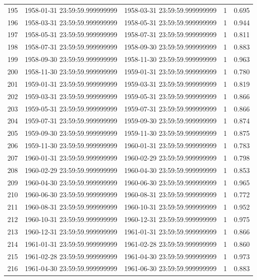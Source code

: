 \begin{table}
\begin{tabular}{lcccc}
195 & 1958-01-31 23:59:59.999999999 & 1958-03-31 23:59:59.999999999 & 1 & 0.695 \\
196 & 1958-03-31 23:59:59.999999999 & 1958-05-31 23:59:59.999999999 & 1 & 0.944 \\
197 & 1958-05-31 23:59:59.999999999 & 1958-07-31 23:59:59.999999999 & 1 & 0.811 \\
198 & 1958-07-31 23:59:59.999999999 & 1958-09-30 23:59:59.999999999 & 1 & 0.883 \\
199 & 1958-09-30 23:59:59.999999999 & 1958-11-30 23:59:59.999999999 & 1 & 0.963 \\
200 & 1958-11-30 23:59:59.999999999 & 1959-01-31 23:59:59.999999999 & 1 & 0.780 \\
201 & 1959-01-31 23:59:59.999999999 & 1959-03-31 23:59:59.999999999 & 1 & 0.819 \\
202 & 1959-03-31 23:59:59.999999999 & 1959-05-31 23:59:59.999999999 & 1 & 0.866 \\
203 & 1959-05-31 23:59:59.999999999 & 1959-07-31 23:59:59.999999999 & 1 & 0.866 \\
204 & 1959-07-31 23:59:59.999999999 & 1959-09-30 23:59:59.999999999 & 1 & 0.874 \\
205 & 1959-09-30 23:59:59.999999999 & 1959-11-30 23:59:59.999999999 & 1 & 0.875 \\
206 & 1959-11-30 23:59:59.999999999 & 1960-01-31 23:59:59.999999999 & 1 & 0.783 \\
207 & 1960-01-31 23:59:59.999999999 & 1960-02-29 23:59:59.999999999 & 1 & 0.798 \\
208 & 1960-02-29 23:59:59.999999999 & 1960-04-30 23:59:59.999999999 & 1 & 0.853 \\
209 & 1960-04-30 23:59:59.999999999 & 1960-06-30 23:59:59.999999999 & 1 & 0.965 \\
210 & 1960-06-30 23:59:59.999999999 & 1960-08-31 23:59:59.999999999 & 1 & 0.772 \\
211 & 1960-08-31 23:59:59.999999999 & 1960-10-31 23:59:59.999999999 & 1 & 0.952 \\
212 & 1960-10-31 23:59:59.999999999 & 1960-12-31 23:59:59.999999999 & 1 & 0.975 \\
213 & 1960-12-31 23:59:59.999999999 & 1961-01-31 23:59:59.999999999 & 1 & 0.866 \\
214 & 1961-01-31 23:59:59.999999999 & 1961-02-28 23:59:59.999999999 & 1 & 0.860 \\
215 & 1961-02-28 23:59:59.999999999 & 1961-04-30 23:59:59.999999999 & 1 & 0.973 \\
216 & 1961-04-30 23:59:59.999999999 & 1961-06-30 23:59:59.999999999 & 1 & 0.883 \\

\end{tabular}
\end{table}

